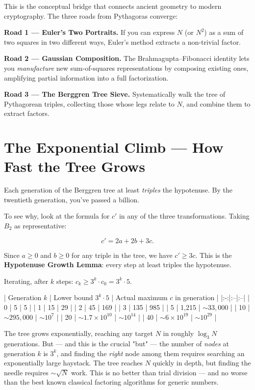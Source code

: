 \documentclass[11pt,twoside,openright]{book}
\theoremstyle{definition}
\theoremstyle{remark}
\begin{document}
This is the conceptual bridge that connects ancient geometry to modern cryptography. The three roads from Pythagoras converge:

\textbf{Road 1 --- Euler's Two Portraits.} If you can express $N$ (or $N^2$) as a sum of two squares in two different ways, Euler's method extracts a non-trivial factor.

\textbf{Road 2 --- Gaussian Composition.} The Brahmagupta--Fibonacci identity lets you \textit{manufacture} new sum-of-squares representations by composing existing ones, amplifying partial information into a full factorization.

\textbf{Road 3 --- The Berggren Tree Sieve.} Systematically walk the tree of Pythagorean triples, collecting those whose legs relate to $N$, and combine them to extract factors.



\section{The Exponential Climb --- How Fast the Tree Grows}

Each generation of the Berggren tree at least \textit{triples} the hypotenuse. By the twentieth generation, you've passed a billion.

To see why, look at the formula for $c'$ in any of the three transformations. Taking $B_2$ as representative:

\[c' = 2a + 2b + 3c.\]

Since $a \geq 0$ and $b \geq 0$ for any triple in the tree, we have $c' \geq 3c$. This is the \textbf{Hypotenuse Growth Lemma}: every step at least triples the hypotenuse.

Iterating, after $k$ steps: $c_k \geq 3^k \cdot c_0 = 3^k \cdot 5$.

| Generation $k$ | Lower bound $3^k \cdot 5$ | Actual maximum $c$ in generation |
|:-:|:--|:--|
| 0 | 5 | 5 |
| 1 | 15 | 29 |
| 2 | 45 | 169 |
| 3 | 135 | 985 |
| 5 | 1,215 | $\sim 33{,}000$ |
| 10 | $\sim 295{,}000$ | $\sim 10^7$ |
| 20 | $\sim 1.7 \times 10^{10}$ | $\sim 10^{14}$ |
| 40 | $\sim 6 \times 10^{19}$ | $\sim 10^{29}$ |

The tree grows exponentially, reaching any target $N$ in roughly $\log_3 N$ generations. But --- and this is the crucial "but" --- the number of \textit{nodes} at generation $k$ is $3^k$, and finding the \textit{right} node among them requires searching an exponentially large haystack. The tree reaches $N$ quickly in depth, but finding the needle requires $\sim \sqrt{N}$ work. This is no better than trial division --- and no worse than the best known classical factoring algorithms for generic numbers.
\end{document}
